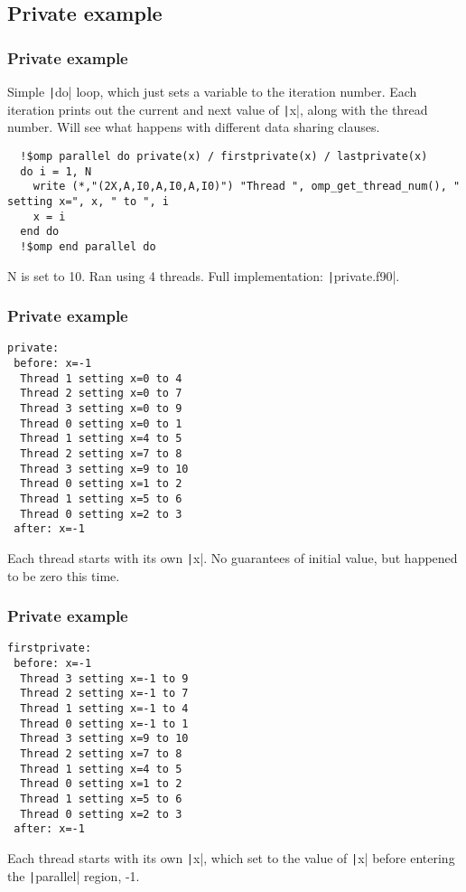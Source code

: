 \documentclass{beamer}
\begin{document}
\subsection{Private example}
\begin{frame}[fragile]
\frametitle{Private example}
Simple \texttt|do| loop, which just sets a variable to the iteration number.
Each iteration prints out the current and next value of \texttt|x|, along with the thread number.
Will see what happens with different data sharing clauses.

\begin{verbatim}
  !$omp parallel do private(x) / firstprivate(x) / lastprivate(x)
  do i = 1, N
    write (*,"(2X,A,I0,A,I0,A,I0)") "Thread ", omp_get_thread_num(), " setting x=", x, " to ", i
    x = i
  end do
  !$omp end parallel do
\end{verbatim}
N is set to 10.
Ran using 4 threads.
Full implementation: \texttt|private.f90|.
\end{frame}

\begin{frame}[fragile]
\frametitle{Private example}
\begin{verbatim}
private:
 before: x=-1
  Thread 1 setting x=0 to 4
  Thread 2 setting x=0 to 7
  Thread 3 setting x=0 to 9
  Thread 0 setting x=0 to 1
  Thread 1 setting x=4 to 5
  Thread 2 setting x=7 to 8
  Thread 3 setting x=9 to 10
  Thread 0 setting x=1 to 2
  Thread 1 setting x=5 to 6
  Thread 0 setting x=2 to 3
 after: x=-1
\end{verbatim}
Each thread starts with its own \texttt|x|.
No guarantees of initial value, but happened to be zero this time.
\end{frame}

\begin{frame}[fragile]
\frametitle{Private example}
\begin{verbatim}
firstprivate:
 before: x=-1
  Thread 3 setting x=-1 to 9
  Thread 2 setting x=-1 to 7
  Thread 1 setting x=-1 to 4
  Thread 0 setting x=-1 to 1
  Thread 3 setting x=9 to 10
  Thread 2 setting x=7 to 8
  Thread 1 setting x=4 to 5
  Thread 0 setting x=1 to 2
  Thread 1 setting x=5 to 6
  Thread 0 setting x=2 to 3
 after: x=-1
\end{verbatim}
Each thread starts with its own \texttt|x|, which set to the value of \texttt|x| before entering the \texttt|parallel| region, -1.
\end{frame}
\end{document}
